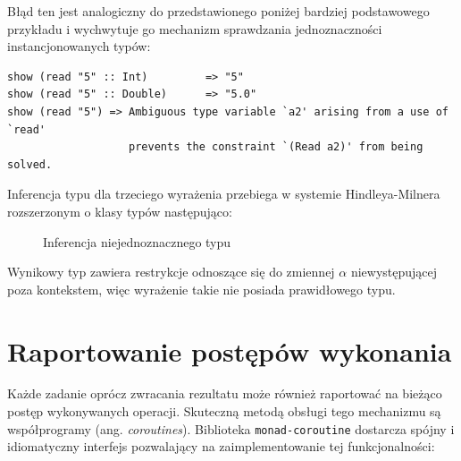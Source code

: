 Błąd ten jest analogiczny do przedstawionego poniżej bardziej podstawowego przykładu i wychwytuje go mechanizm sprawdzania jednoznaczności instancjonowanych typów:
\begin{lstlisting}
show (read "5" :: Int)         => "5"
show (read "5" :: Double)      => "5.0"
show (read "5") => Ambiguous type variable `a2' arising from a use of `read'
                   prevents the constraint `(Read a2)' from being solved.
\end{lstlisting}

Inferencja typu dla trzeciego wyrażenia przebiega w systemie Hindleya-Milnera\cite{HM} rozszerzonym o klasy typów\cite{TC} następująco:
\begin{figure}[h]
\scriptsize 
\begin{mdframed}
\begin{prooftree}
 
  
  

\end{prooftree}
\end{mdframed}
\caption{Inferencja niejednoznacznego typu}
\end{figure}

Wynikowy typ zawiera restrykcje odnoszące się do zmiennej $\alpha$ niewystępującej poza kontekstem, więc wyrażenie takie nie posiada prawidłowego typu\cite{Report}.

\section{Raportowanie postępów wykonania}
Każde zadanie oprócz zwracania rezultatu może również raportować na bieżąco postęp wykonywanych operacji. Skuteczną metodą obsługi tego mechanizmu są współprogramy (ang. \textit{coroutines}). Biblioteka \texttt{monad-coroutine}\cite{Coroutine} dostarcza spójny i idiomatyczny interfejs pozwalający na zaimplementowanie tej funkcjonalności:


